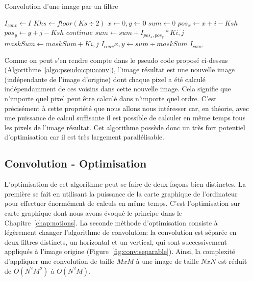 \begin{algorithm}[H]
	\caption{Convolution d'une image par un filtre}
	\begin{algorithmic}
		\State $I_{conv} \gets I$
		\State $Khs \gets floor(Ks \div 2)$
		\State $x \gets 0, y \gets 0$
		\State $sum \gets 0$
					\State ${pos_x \gets x + i - Ksh}$ 
					\State ${pos_y \gets y + j - Ksh}$ 
					 
						\State $continue$
					\EndIf
					\State $sum \gets sum + I_{pos_x, pos_y} * K{i, j}$ 
					\State $maskSum \gets maskSum + K{i, j}$
					\EndFor
				\EndFor
				\State $I_{conv}{x, y} \gets sum \div maskSum$ 
			\EndFor
		\EndFor
		\State \Return $I_{conv}$ 
		\EndProcedure
	\end{algorithmic}
	\label{algo:pseudo:cpu:conv}
\end{algorithm}

Comme on peut s'en rendre compte dans le pseudo code proposé ci-dessus (Algorithme~\ref{algo:pseudo:cpu:conv}), l'image résultat est une nouvelle image (indépendante de l'image d'origine) dont chaque pixel a été calculé indépendamment de ces voisins dans cette nouvelle image. Cela signifie que n'importe quel pixel peut être calculé dans n'importe quel ordre. C'est précisément à cette propriété que nous allons nous intéresser car, en théorie, avec une puissance de calcul suffisante il est possible de calculer en même temps tous les pixels de l'image résultat. Cet algorithme possède donc un très fort potentiel d'optimisation car il est très largement parallélisable.

\subsection{Convolution - Optimisation}
L'optimisation de cet algorithme peut se faire de deux façons bien distinctes. La première se fait en utilisant la puissance de la carte graphique de l'ordinateur pour effectuer énormément de calculs en même temps. C'est l'optimisation sur carte graphique dont nous avons évoqué le principe dans le Chapitre~\ref{chap:notions}. La seconde méthode d'optimisation consiste à légèrement changer l'algorithme de convolution: la convolution est séparée en deux filtres distincts\cite{podlozhnyuk2007image}, un horizontal et un vertical, qui sont successivement appliqués à l'image origine (Figure~\ref{fig:conv:separable}). Ainsi, la complexité d'appliquer une convolution de taille $MxM$ à une image de taille $NxN$ est réduit de $O(N^2M^2)$ à $O(N^2M)$.

